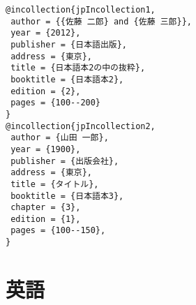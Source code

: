 \documentclass[9pt, twocolumn, a4paper]{jsarticle}
\begin{document}
\begin{bibunit}[IEEJtran]
\begin{lstlisting}
@incollection{jpIncollection1,
 author = {{佐藤 二郎} and {佐藤 三郎}},
 year = {2012},
 publisher = {日本語出版},
 address = {東京},
 title = {日本語本2の中の抜粋},
 booktitle = {日本語本2},
 edition = {2},
 pages = {100--200}
}
@incollection{jpIncollection2,
 author = {山田 一郎},
 year = {1900},
 publisher = {出版会社},
 address = {東京},
 title = {タイトル},
 booktitle = {日本語本3},
 chapter = {3},
 edition = {1},
 pages = {100--150},
}
\end{lstlisting}

{\footnotesize \putbib[samplebib]}
\end{bibunit}

\clearpage
\section{英語}
\end{document}

